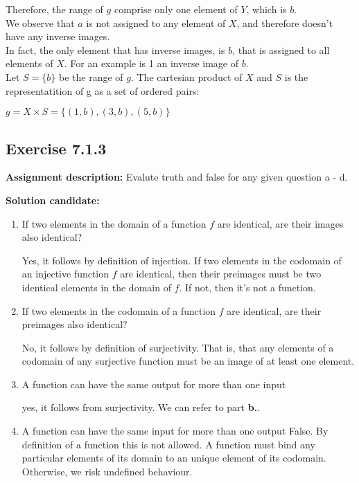 \documentclass{report}
\newcommand{\cent}[1]{\begin{center}#1\end{center}}
\newcommand{\AssignmentDescription}{\textbf{Assignment description: }}
\newcommand{\Solution}{\textbf{Solution candidate: }}
\newcommand{\QED}{\boxed{}}
\newcommand{\Exercise}[1]{\subsection{Exercise #1}}
\newcommand{\defaultEnumerateLabel}{\textbf{\alph*.}}
\begin{document}
 	Therefore, the range of $g$ comprise only one element of $Y$, which is $b$.\\
 	
 	We observe that $a$ is not assigned to any element of $X$, and therefore doesn't have any inverse images.\\
 	
 	In fact, the only element that has inverse images, is $b$, that is assigned to all elements of $X$. For an example is 1 an inverse image of $b$. \\
 	
 	Let $S = \{b\}$ be the range of $g$. The cartesian product of $X$ and $S$ is the representatition of g as a set of ordered pairs:
 	
 	\cent{$g = X \times S = \{(1,b),(3,b),(5,b)\}$}
 	
 	\QED
 	
 	\Exercise{7.1.3}
 	\AssignmentDescription
 	Evalute truth and false for any given question a - d.
 	
 	\Solution
 	
 	\begin{enumerate}[label=\defaultEnumerateLabel]
 		\item If two elements in the domain of a function $f$ are identical, are their images also identical?
 		
 		Yes, it follows by definition of injection. If two elements in the codomain of an injective  function $f$ are identical, then their preimages must be two identical elements in the domain of $f$. If not, then it's not a function.
 		
 		\item If two elements in the codomain of a function $f$ are identical, are their preimages also identical?
 		
 		No, it follows by definition of surjectivity. That is, that any elements of a codomain of any surjective function must be an image of at least one element. 
 		
 		\item A function can have the same output for more than one input
 		
 		yes, it follows from surjectivity. We can refer to part \textbf{b.}.
 		
 		\item A function can have the same input for more than one output
 		False. By definition of a function this is not allowed. A function must bind any particular elements of its domain to an unique element of its codomain. Otherwise, we risk undefined behaviour.
 	\end{enumerate}
 
\end{document}
